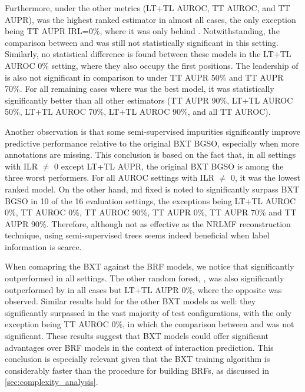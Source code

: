 
Furthermore, under the other metrics (LT+TL AUROC, TT AUROC, and TT AUPR),  was the highest ranked estimator in almost all cases, the only exception being TT AUPR IRL=0\%, where it was only behind . Notwithstanding, the comparison between  and  was still not statistically significant in this setting. Similarly, no statistical difference is found between these models in the LT+TL AUROC 0\% setting, where they also occupy the first positions. The leadership of  is also not significant in comparison to  under TT AUPR 50\% and TT AUPR 70\%. For all remaining cases where  was the best model, it was statistically significantly better than all other estimators (TT AUPR 90\%, LT+TL AUROC 50\%, LT+TL AUROC 70\%, LT+TL AUROC 90\%, and all TT AUROC).


Another observation is that some semi-supervised impurities significantly improve predictive performance relative to the original BXT BGSO, especially when more annotations are missing. This conclusion is based on the fact that, in all settings with ILR $\neq$ 0 except LT+TL AUPR, the original BXT BGSO is among the three worst performers. For all AUROC settings with ILR $\neq$ 0, it was the lowest ranked model. On the other hand, md fixed is noted to significantly surpass BXT BGSO in 10 of the 16 evaluation settings, the exceptions being LT+TL AUROC 0\%, TT AUROC 0\%, TT AUROC 90\%, TT AUPR 0\%, TT AUPR 70\% and TT AUPR 90\%. Therefore, although not as effective as the NRLMF reconstruction technique, using semi-supervised trees seems indeed beneficial when label information is scarce.


When comapring the BXT against the BRF models, we notice that  significantly outperformed  in all settings. The other random forest, , was also significantly outperformed by  in all cases but LT+TL AUPR 0\%, where the opposite was observed. Similar results hold for the other BXT models as well: they significantly surpassed  in the vast majority of test configurations, with the only exception being TT AUROC 0\%, in which the comparison between  and  was not significant. These results suggest that BXT models could offer significant advantages over BRF models in the context of interaction prediction. This conclusion is especially relevant given that the BXT training algorithm is considerably faster than the procedure for building BRFs, as discussed in \autoref{sec:complexity_analysis}.

